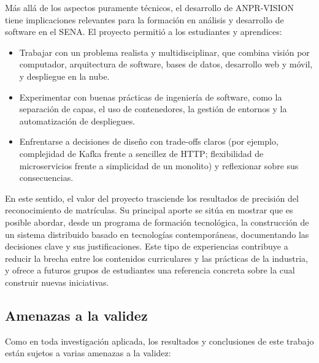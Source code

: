 Más allá de los aspectos puramente técnicos, el desarrollo de ANPR-VISION tiene implicaciones relevantes para la formación en análisis y desarrollo de software en el SENA. El proyecto permitió a los estudiantes y aprendices:

\begin{itemize}
    \item Trabajar con un problema realista y multidisciplinar, que combina visión por computador, arquitectura de software, bases de datos, desarrollo web y móvil, y despliegue en la nube.
    \item Experimentar con buenas prácticas de ingeniería de software, como la separación de capas, el uso de contenedores, la gestión de entornos y la automatización de despliegues.
    \item Enfrentarse a decisiones de diseño con trade-offs claros (por ejemplo, complejidad de Kafka frente a sencillez de HTTP; flexibilidad de microservicios frente a simplicidad de un monolito) y reflexionar sobre sus consecuencias.
\end{itemize}

En este sentido, el valor del proyecto trasciende los resultados de precisión del reconocimiento de matrículas. Su principal aporte se sitúa en mostrar que es posible abordar, desde un programa de formación tecnológica, la construcción de un sistema distribuido basado en tecnologías contemporáneas, documentando las decisiones clave y sus justificaciones. Este tipo de experiencias contribuye a reducir la brecha entre los contenidos curriculares y las prácticas de la industria, y ofrece a futuros grupos de estudiantes una referencia concreta sobre la cual construir nuevas iniciativas.

\subsection{Amenazas a la validez}

Como en toda investigación aplicada, los resultados y conclusiones de este trabajo están sujetos a varias amenazas a la validez:

